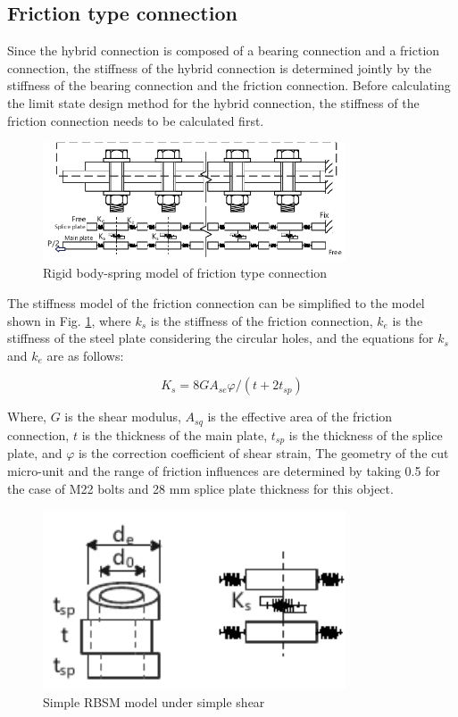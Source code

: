 \subsection{Friction type connection}

Since the hybrid connection is composed of a bearing connection and a friction connection, the stiffness of the hybrid connection is determined jointly by the stiffness of the bearing connection and the friction connection. Before calculating the limit state design method for the hybrid connection, the stiffness of the friction connection needs to be calculated first.

\begin{figure}[htbp]
    \centering
    \includegraphics[width=0.8\textwidth]{imgs/ch7/RBSM.pdf}
    \caption{Rigid body-spring model of friction type connection}
    \label{fig-rbsm}
\end{figure}

The stiffness model of the friction connection can be simplified to the model shown in Fig. \ref{fig-rbsm}, where $k_{s}$ is the stiffness of the friction connection, $k_{e}$ is the stiffness of the steel plate considering the circular holes, and the equations for $k_{s}$ and $k_{e}$ are as follows:

\begin{equation}\label{eq-ks}
    K_{s} = 8GA_{se} \varphi / (t + 2 t_{sp})
\end{equation}

Where, $G$ is the shear modulus, $A_{sq}$ is the effective area of the friction connection, $t$ is the thickness of the main plate, $t_{sp}$ is the thickness of the splice plate, and $\varphi$ is the correction coefficient of shear strain, The geometry of the cut micro-unit and the range of friction influences are determined by taking 0.5 for the case of M22 bolts and 28 mm splice plate thickness for this object.

\begin{figure}[htbp]
    \centering
    \includegraphics[width=0.8\textwidth]{imgs/ch7/simp_rbsm.pdf}
    \caption{Simple RBSM model under simple shear}
    \label{fig-simp_rbsm}
\end{figure}

